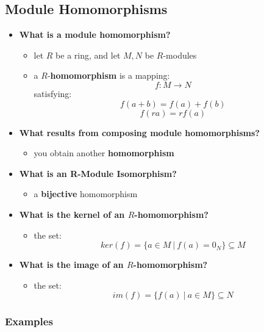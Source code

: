 \documentclass{exam}
\begin{document}
\subsection{Module Homomorphisms}

\begin{itemize}
    \item \textbf{What is a module homomorphism?}
    \begin{itemize}
        \item let $R$ be a ring, and let $M,N$ be $R$-modules
        \item a $R$-\textbf{homomorphism} is a mapping:
        \[
        f : M \to N
        \]
        satisfying:
        \[
        f(a+b) = f(a) + f(b)
        \]
        \[
        f(ra) = rf(a)
        \]
    \end{itemize}
    \item \textbf{What results from composing module homomorphisms?}
    \begin{itemize}
        \item you obtain another \textbf{homomorphism}
    \end{itemize}
    \item \textbf{What is an R-Module Isomorphism?}
    \begin{itemize}
        \item a \textbf{bijective} homomorphism
    \end{itemize}
    \item \textbf{What is the kernel of an $R$-homomorphism?}
    \begin{itemize}
        \item the set:
        \[
        ker(f) = \{a \in M \ | \ f(a) = 0_N\} \subseteq M
        \]
    \end{itemize}
    \item \textbf{What is the image of an $R$-homomorphism?}
    \begin{itemize}
        \item the set:
        \[
        im(f) = \{f(a) \ | \ a \in M\} \subseteq N
        \]
    \end{itemize}
\end{itemize}

\subsubsection{Examples}
\end{document}

